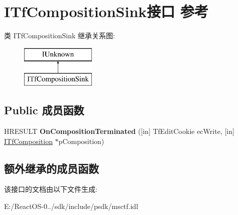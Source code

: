\hypertarget{interface_i_tf_composition_sink}{}\section{I\+Tf\+Composition\+Sink接口 参考}
\label{interface_i_tf_composition_sink}
类 I\+Tf\+Composition\+Sink 继承关系图\+:\begin{figure}[H]
\begin{center}
\leavevmode
\includegraphics[height=2.000000cm]{interface_i_tf_composition_sink}
\end{center}
\end{figure}
\subsection*{Public 成员函数}
\begin{DoxyCompactItemize}
\item 
\mbox{\label{interface_i_tf_composition_sink_a82c004c257696d36d7e05e251aca292a}} 
H\+R\+E\+S\+U\+LT {\bfseries On\+Composition\+Terminated} (\mbox{[}in\mbox{]} Tf\+Edit\+Cookie ec\+Write, \mbox{[}in\mbox{]} \hyperlink{interface_i_tf_composition}{I\+Tf\+Composition} $\ast$p\+Composition)
\end{DoxyCompactItemize}
\subsection*{额外继承的成员函数}


该接口的文档由以下文件生成\+:\begin{DoxyCompactItemize}
\item 
E\+:/\+React\+O\+S-\/0../sdk/include/psdk/msctf.\+idl\end{DoxyCompactItemize}
